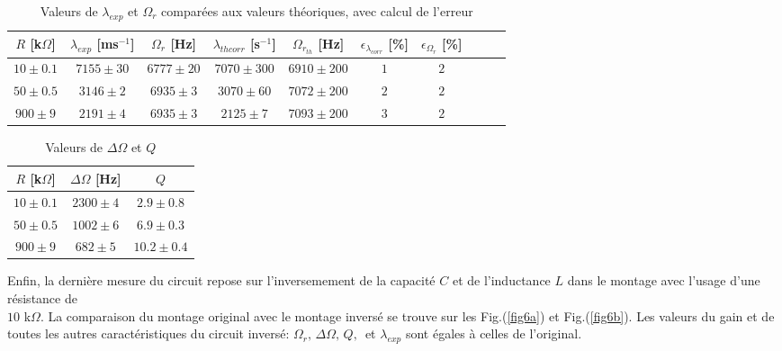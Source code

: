 \documentclass[a4paper, 12pt,oneside]{article}
\begin{document}
\begin{table}[h]
\centering
 \begin{tabular}{||c| c| c| c| c| c| c| c| c|c ||}
 \hline
 $R$ [k$\Omega$] & $\lambda_{exp}$ [ms$^{-1}$] & $\Omega_{r}$ [Hz]& $\lambda_{th corr}$ [s$^{-1}$] & $\Omega_{r_{th}}$ [Hz]&$\epsilon_{\lambda_{corr}}$ [\%]  & $\epsilon_{\Omega_r}$ [\%]\\ [0.5ex] 
 \hline\hline
 $10 \pm 0.1$ & $7155 \pm 30$ & $6777 \pm 20$ & $7070 \pm 300$ & $6910\pm 200$ & $1$ & $2$  \\
 \hline
 $50 \pm 0.5$ & $3146 \pm 2$ & $6935\pm 3$ & $3070\pm 60$ & $7072 \pm 200$ & $2$ & $2$ \\
 \hline
 $900 \pm 9$ & $2191 \pm 4$ & $6935\pm 3$ & $2125 \pm 7$ & $7093 \pm 200$ & $3$ & $2$\\
\hline
\end{tabular}
\captionsetup{justification=centering}
\caption{Valeurs de $\lambda_{exp}$ et $\Omega_r$ comparées aux valeurs théoriques, avec calcul de l'erreur}
\label{table2}
\vspace{-0.2cm}
\end{table}

\begin{wraptable}{h}{0.4\textwidth}
\vspace{-0.3cm}
\raggedleft
 \begin{tabular}{||c| c|c||} 
 \hline
 $R$ [k$\Omega$] &$\Delta\Omega$ [Hz] & $Q$\\ [0.5ex] 
 \hline\hline
 $10 \pm 0.1$ & $2300\pm 4$ & $2.9\pm 0.8$ \\ 
 \hline
 $50 \pm 0.5$ & $1002 \pm 6$ & $6.9 \pm 0.3$ \\
 \hline
 $900 \pm 9$ & $682 \pm 5$ & $10.2\pm 0.4$\\
\hline
\end{tabular}
\captionsetup{justification=raggedleft}
\caption{Valeurs de $\Delta\Omega$ et $Q$}
\label{table3}
\end{wraptable}


Enfin, la dernière mesure du circuit repose sur l'inversemement de la capacité $C$ et de l'inductance $L$ dans le montage avec l'usage d'une résistance de \\$10$ k$\Omega$. La comparaison du montage original avec le montage inversé se trouve sur les Fig.(\ref{fig6a}) et Fig.(\ref{fig6b}). Les valeurs du gain et de toutes les autres caractéristiques du circuit inversé: $\Omega_r,\,\Delta\Omega,\,Q,\,$ et $\lambda_{exp}$ sont égales à celles de l'original.
\end{document}
